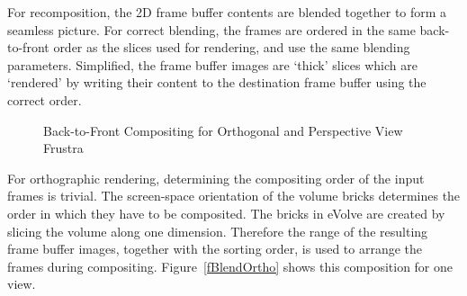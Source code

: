 \documentclass[10pt,a4]{scrartcl}
\newcommand{\fig}[1]{Figure~\ref{#1}}
\begin{document}
For recomposition, the 2D frame buffer contents are blended together to
form a seamless picture. For correct blending, the frames are ordered in
the same back-to-front order as the slices used for rendering, and use the
same blending parameters. Simplified, the frame buffer images are
`thick' slices which are `rendered' by writing their content to the
destination frame buffer using the correct order. 

\begin{figure}[h!t]
  \hfil
  {\caption{\small\label{fBlend}Back-to-Front Com\-po\-siting for
      Orthogonal and Perspective View Frustra}}
\end{figure}
For orthographic rendering, determining the compositing order of the
input frames is trivial. The screen-space orientation of the volume
bricks determines the order in which they have to be composited. The
bricks in \textsf{eVolve} are created by slicing the volume along one
dimension. Therefore the range of the resulting frame buffer images,
together with the sorting order, is used to arrange the frames during
compositing. \fig{fBlendOrtho} shows this composition for one view.
\end{document}
